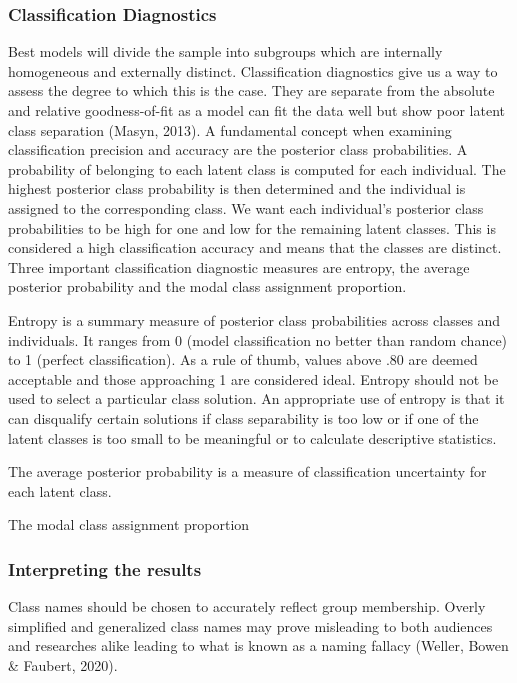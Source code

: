 \documentclass[
  ,man]{apa6}
\begin{document}
\hypertarget{classification-diagnostics}{%
\subsubsection{Classification Diagnostics}\label{classification-diagnostics}}

Best models will divide the sample into subgroups which are internally homogeneous and externally distinct.
Classification diagnostics give us a way to assess the degree to which this is the case.
They are separate from the absolute and relative goodness-of-fit
as a model can fit the data well but show poor latent class separation (Masyn, 2013).
A fundamental concept when examining classification precision and accuracy are the posterior class probabilities.
A probability of belonging to each latent class is computed for each individual.
The highest posterior class probability is then determined and the individual is assigned to the corresponding class.
We want each individual's posterior class probabilities to be high for one and low for the remaining latent classes.
This is considered a high classification accuracy and means that the classes are distinct.
Three important classification diagnostic measures are entropy, the average posterior probability and the modal class assignment proportion.

Entropy is a summary measure of posterior class probabilities across classes and individuals.
It ranges from 0 (model classification no better than random chance) to 1 (perfect classification).
As a rule of thumb, values above .80 are deemed acceptable and those approaching 1 are considered ideal.
Entropy should not be used to select a particular class solution.
An appropriate use of entropy is that it can disqualify certain solutions if class separability is too low
or if one of the latent classes is too small to be meaningful or to calculate descriptive statistics.

The average posterior probability is a measure of classification uncertainty for each latent class.

The modal class assignment proportion

\hypertarget{interpreting-the-results}{%
\subsubsection{Interpreting the results}\label{interpreting-the-results}}

Class names should be chosen to accurately reflect group membership.
Overly simplified and generalized class names may prove misleading to both audiences and researches alike
leading to what is known as a naming fallacy (Weller, Bowen \& Faubert, 2020).
\end{document}
